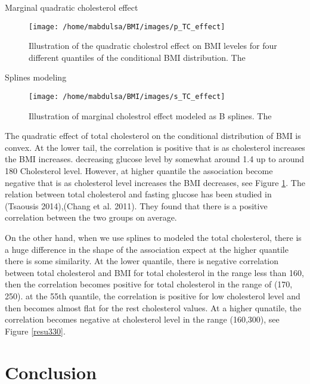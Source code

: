\documentclass[
  12pt,
]{article}
\begin{document}
Marginal quadratic cholesterol effect

\begin{figure}

{\centering \texttt{[image: /home/mabdulsa/BMI/images/p\_TC\_effect]} 

}

\caption{Illustration of the quadratic cholestrol effect on BMI leveles for four different quantiles of the conditional BMI distribution.  The }\label{fig:resu4}
\end{figure}

Splines modeling

\begin{figure}

{\centering \texttt{[image: /home/mabdulsa/BMI/images/s\_TC\_effect]} 

}

\caption{ Illustration of marginal cholestrol effect modeled as B splines.  The }\label{fig:resu330}
\end{figure}

The quadratic effect of total cholesterol on the conditional distribution of BMI is convex. At the lower tail, the correlation is positive that is as cholesterol increases the BMI increases. decreasing glucose level by somewhat around 1.4 up to around 180 Cholesterol level. However, at higher quantile the association become negative that is as cholesterol level increases the BMI decreases, see Figure \ref{fig:resu4}. The relation between total cholesterol and fasting glucose has been studied in (Tsaousis 2014),(Chang et al. 2011). They found that there is a positive correlation between the two groups on average.

On the other hand, when we use splines to modeled the total cholesterol, there is a huge difference in the shape of the association expect at the higher quantile there is some similarity. At the lower quantile, there is negative correlation between total cholesterol and BMI for total cholesterol in the range less than 160, then the correlation becomes positive for total cholesterol in the range of (170, 250). at the 55th quantile, the correlation is positive for low cholesterol level and then becomes almost flat for the rest cholesterol values. At a higher qunatile, the correlation becomes negative at cholesterol level in the range (160,300), see Figure \ref{resu330}.

\section{Conclusion}
\end{document}
